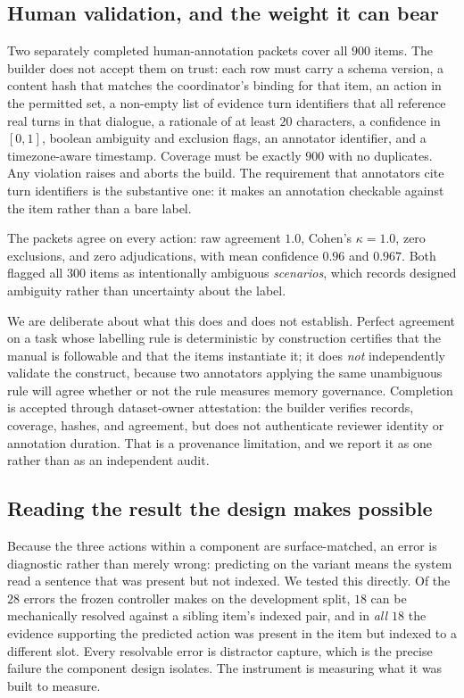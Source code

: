 \subsection{Human validation, and the weight it can bear}

Two separately completed human-annotation packets cover all $900$ items. The builder does not
accept them on trust: each row must carry a schema version, a content hash that
matches the coordinator's binding for that item, an action in the permitted set,
a non-empty list of evidence turn identifiers that all reference real turns in
that dialogue, a rationale of at least $20$ characters, a confidence in
$[0,1]$, boolean ambiguity and exclusion flags, an annotator identifier, and a
timezone-aware timestamp. Coverage must be exactly $900$ with no duplicates.
Any violation raises and aborts the build. The requirement that annotators cite
turn identifiers is the substantive one: it makes an annotation checkable
against the item rather than a bare label.

The packets agree on every action: raw agreement $1.0$, Cohen's $\kappa =
1.0$, zero exclusions, and zero adjudications, with mean confidence $0.96$ and
$0.967$. Both flagged all $300$ \abstain{} items as intentionally ambiguous
\emph{scenarios}, which records designed ambiguity rather than uncertainty about
the label.

We are deliberate about what this does and does not establish. Perfect
agreement on a task whose labelling rule is deterministic by construction
certifies that the manual is followable and that the items instantiate it; it
does \emph{not} independently validate the construct, because two annotators
applying the same unambiguous rule will agree whether or not the rule measures
memory governance. Completion is accepted through dataset-owner attestation:
the builder verifies records, coverage, hashes, and agreement, but does not
authenticate reviewer identity or annotation duration. That is a provenance
limitation, and we report it as one rather than as an independent audit.

\subsection{Reading the result the design makes possible}

Because the three actions within a component are surface-matched, an error is
diagnostic rather than merely wrong: predicting \supersede{} on the \keep{}
variant means the system read a sentence that was present but not indexed. We
tested this directly. Of the $28$ errors the frozen controller makes on the
development split, $18$ can be mechanically resolved against a sibling item's
indexed pair, and in \emph{all $18$} the evidence supporting the predicted
action was present in the item but indexed to a different slot. Every
resolvable error is distractor capture, which is the precise failure the component
design isolates. The instrument is measuring what it was built to measure.

